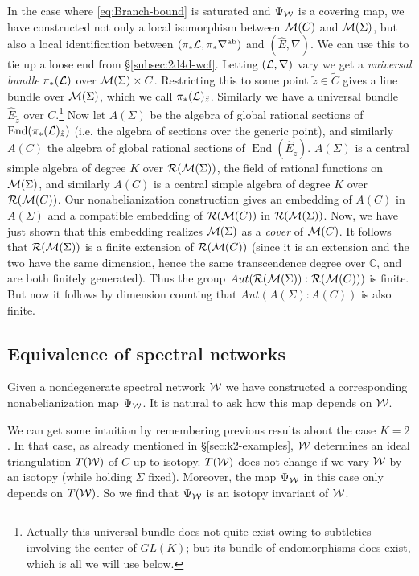 \documentclass[11pt,a4paper]{article}
\def\IC{\mathbb{C}}
\def\CM {{\cal M}}
\def\CR {{\cal R}}
\def\CL {{\cal L}}
\def\wnet {{\cal W}}
\def\ab{{\mathrm{ab}}}
\newcommand{\ti}[1]{\textit{#1}}
\def\IC{\mathbb{C}}
\def\CM {{\cal M}}
\def\CR {{\cal R}}
\def\CL {{\cal L}}
\def\wnet {{\cal W}}
\DeclareMathOperator{\End}{{End}}
\begin{document}
In the case where \eqref{eq:Branch-bound} is saturated and $\Psi_\wnet$ is a covering
map, we have constructed not only a local isomorphism between $\CM(C)$ and $\CM(\Sigma)$,
but also a local identification between $(\pi_* \CL, \pi_* \nabla^\ab)$ and $(\hat E, \nabla)$.
We can use this to tie up a loose end from \S\ref{subsec:2d4d-wcf}.  Letting $(\CL,\nabla)$
vary we get a \ti{universal bundle} $\pi_*(\CL)$ over $\CM(\Sigma) \times C$.
Restricting this to some point
$\tilde{z} \in \tilde{C}$ gives a line bundle over $\CM(\Sigma)$, which we call $\pi_*(\CL)_{\tilde{z}}$.
Similarly we have a universal bundle $\hat E_{\tilde{z}}$ over $C$.\footnote{Actually this universal bundle does not quite exist owing
to subtleties involving the center of $GL(K)$; but its bundle of endomorphisms does exist, which is all we will use below.}
Now let $A(\Sigma)$ be the algebra of
global rational sections of $\End(\pi_*(\CL)_{\tilde{z}})$ (i.e. the algebra of sections over the generic point),
and similarly $A(C)$ the algebra of global rational sections
of $\End(\hat E_{\tilde{z}})$.  $A(\Sigma)$ is a central simple algebra of degree $K$ over
$\CR(\CM(\Sigma))$, the field of rational functions on $\CM(\Sigma)$,
and similarly $A(C)$ is a central simple algebra of degree $K$ over $\CR(\CM(C))$.
Our nonabelianization construction gives an embedding of
$A(C)$ in $A(\Sigma)$ and a compatible embedding of $\CR(\CM(C))$ in $\CR(\CM(\Sigma))$.  Now, we have just
shown that this embedding realizes $\CM(\Sigma)$ as a \ti{cover} of $\CM(C)$.  It follows that
$\CR(\CM(\Sigma))$ is a finite extension of $\CR(\CM(C))$ (since it is an extension and the two have the same
dimension, hence the same transcendence degree over $\IC$, and are both finitely generated).
Thus the group $Aut(\CR(\CM(\Sigma)):\CR(\CM(C)))$ is finite.
But now it follows by dimension counting that $Aut(A(\Sigma):A(C))$ is also finite.


\subsection{Equivalence of spectral networks}\label{subsubsec:EqivalentGSN}

Given a nondegenerate spectral network $\wnet$
we have constructed a corresponding nonabelianization map $\Psi_\wnet$.
It is natural to ask how this map depends on $\wnet$.

We can get some intuition by remembering previous results about the case $K=2$.  In that case, as already mentioned
in \S\ref{sec:k2-examples}, $\wnet$ determines
an ideal triangulation $T(\wnet)$ of $C$ up to isotopy.  $T(\wnet)$ does not change if we vary $\wnet$ by an isotopy (while holding $\Sigma$ fixed).
Moreover, the map $\Psi_\wnet$ in this case only depends on $T(\wnet)$.  So we find that $\Psi_\wnet$ is an isotopy invariant of $\wnet$.
\end{document}
